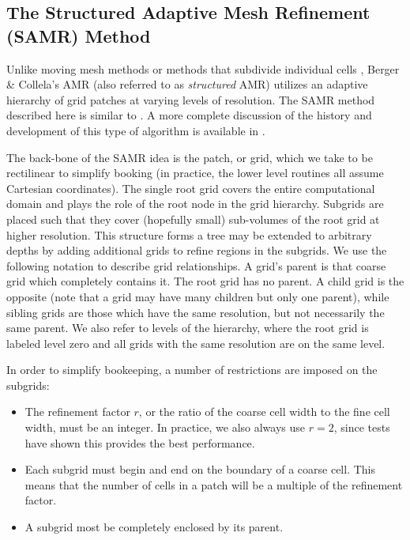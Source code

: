\subsection{The Structured Adaptive Mesh Refinement (SAMR) Method}
\label{sec.amr}


Unlike moving mesh methods \citep{1995ApJS..100..269P,1995ApJS...97..231G} or  methods that subdivide individual cells \citep{Adjerid}, Berger \& Collela's AMR (also referred to as \emph{structured} AMR) utilizes an adaptive hierarchy of grid patches at varying levels of resolution.  The SAMR method described here is similar to \citet{Berger89}.  A more complete discussion of the history and development of this type of algorithm is available in \citet{Neeman96}.

The back-bone of the SAMR idea is the patch, or grid, which we take to be rectilinear to simplify booking (in practice, the lower level routines all assume Cartesian coordinates).  The single root grid covers the entire computational domain and plays the role of the root node in the grid hierarchy.  Subgrids are placed such that they cover (hopefully small) sub-volumes of the root grid at higher resolution.  This structure forms a tree may be extended to arbitrary depths by adding additional grids to refine regions in the subgrids.  We use the following notation to describe grid relationships.  A grid's parent is that coarse grid which completely contains it.  The root grid has no parent.  A child grid is the opposite (note that a grid may have many children but only one parent), while sibling grids are those which have the same resolution, but not necessarily the same parent.  We also refer to levels of the hierarchy, where the root grid is labeled level zero and all grids with the same resolution are on the
same level.

In order to simplify bookeeping, a number of restrictions are imposed on the subgrids:
\begin{itemize}
 \item The refinement factor $r$, or the ratio of the coarse cell width to the fine cell width, must be an integer.  In practice, we also always use $r=2$, since tests have shown this provides the best performance.
 \item Each subgrid must begin and end on the boundary of a coarse cell.  This means that the number of cells in a patch will be a multiple of the refinement factor.
 \item A subgrid most be completely enclosed by its parent.
\end{itemize}

